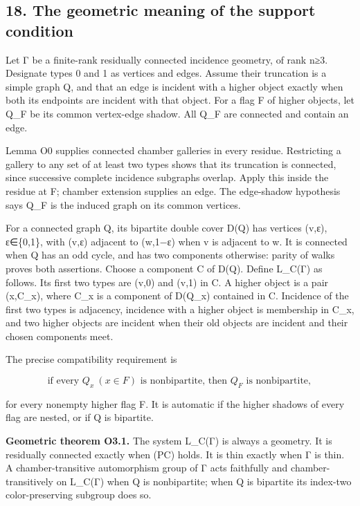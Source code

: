 \documentclass[
  10pt,
  letterpaper,
]{article}
\newcounter{none} %
\begin{document}
\subsection{18. The geometric meaning of the support
condition}\label{the-geometric-meaning-of-the-support-condition}

Let Γ be a finite-rank residually connected incidence geometry, of rank
n≥3. Designate types 0 and 1 as vertices and edges. Assume their
truncation is a simple graph Q, and that an edge is incident with a
higher object exactly when both its endpoints are incident with that
object. For a flag F of higher objects, let Q\_F be its common
vertex-edge shadow. All Q\_F are connected and contain an edge.

Lemma O0 supplies connected chamber galleries in every residue.
Restricting a gallery to any set of at least two types shows that its
truncation is connected, since successive complete incidence subgraphs
overlap. Apply this inside the residue at F; chamber extension supplies
an edge. The edge-shadow hypothesis says Q\_F is the induced graph on
its common vertices.

For a connected graph Q, its bipartite double cover D(Q) has vertices
(v,ε), ε∈\{0,1\}, with (v,ε) adjacent to (w,1−ε) when v is adjacent to
w. It is connected when Q has an odd cycle, and has two components
otherwise: parity of walks proves both assertions. Choose a component C
of D(Q). Define L\_C(Γ) as follows. Its first two types are (v,0) and
(v,1) in C. A higher object is a pair (x,C\_x), where C\_x is a
component of D(Q\_x) contained in C. Incidence of the first two types is
adjacency, incidence with a higher object is membership in C\_x, and two
higher objects are incident when their old objects are incident and
their chosen components meet.

The precise compatibility requirement is

\[
\text{if every }Q_x\ (x\in F)\text{ is nonbipartite, then }Q_F
\text{ is nonbipartite},
\tag{PC}
\]

for every nonempty higher flag F. It is automatic if the higher shadows
of every flag are nested, or if Q is bipartite.

\textbf{Geometric theorem O3.1.} The system L\_C(Γ) is always a
geometry. It is residually connected exactly when (PC) holds. It is thin
exactly when Γ is thin. A chamber-transitive automorphism group of Γ
acts faithfully and chamber-transitively on L\_C(Γ) when Q is
nonbipartite; when Q is bipartite its index-two color-preserving
subgroup does so.
\end{document}
